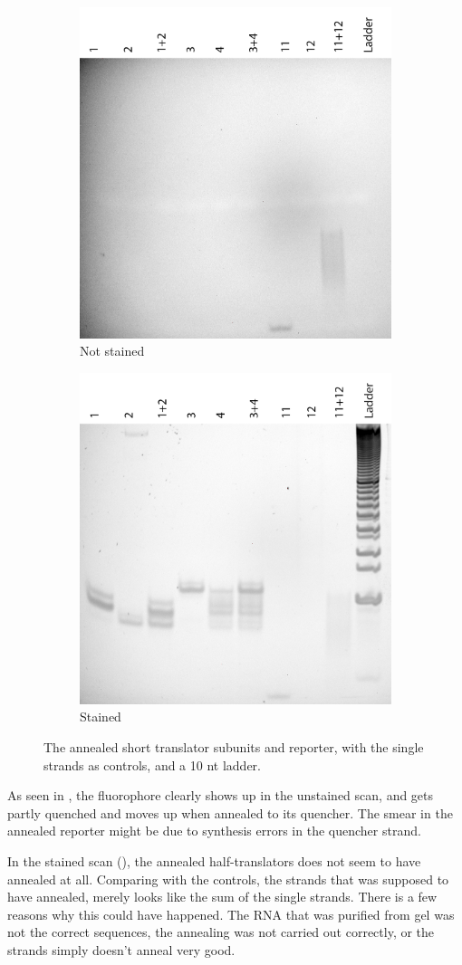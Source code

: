 \begin{figure}[h]
\begin{subfigure}[t]{.5\textwidth}
  \includegraphics[width=.5\textwidth]{images/transcription_annealed_nostain.png}
  \caption{Not stained}
  \label{transcription_annealed_nostain}
\end{subfigure}
\begin{subfigure}[t]{.5\textwidth}
  \includegraphics[width=.5\textwidth]{images/transcription_annealed_stain.png}
  \caption{Stained}
  \label{transcription_annealed_stain}
\end{subfigure}
\caption{The annealed short translator subunits and reporter, with the single strands as controls, and a 10 nt ladder.}
\label{transcription_annealed}
\end{figure}

As seen in , the fluorophore clearly shows up in the unstained scan, and gets partly quenched and moves up when annealed to its quencher. The smear in the annealed reporter might be due to synthesis errors in the quencher strand.

In the stained scan (), the annealed half-translators does not seem to have annealed at all. Comparing with the controls, the strands that was supposed to have annealed, merely looks like the sum of the single strands. There is a few reasons why this could have happened. The RNA that was purified from gel was not the correct sequences, the annealing was not carried out correctly, or the strands simply doesn't anneal very good.

